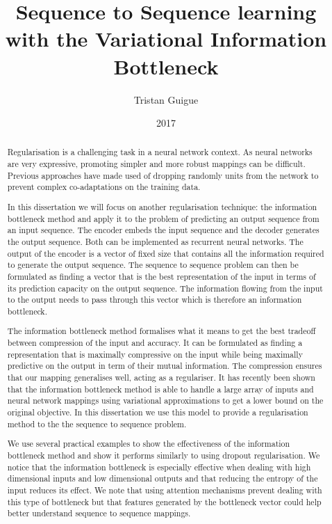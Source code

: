 \documentclass[11pt,oneside,openright]{report}
\title{Sequence to Sequence learning with the Variational Information Bottleneck}
\author{Tristan Guigue}
\date{2017}
\begin{document}
\maketitle

\declaration

\begin{abstract}
Regularisation is a challenging task in a neural network context. As neural networks are very expressive,  promoting simpler and more robust mappings can be difficult. Previous approaches have made used of dropping randomly units from the network to prevent complex co-adaptations on the training data.

In this dissertation we will focus on another regularisation technique: the information bottleneck method and apply it to the problem of predicting an output sequence from an input sequence. The encoder embeds the input sequence and the decoder generates the output sequence. Both can be implemented as recurrent neural networks. The output of the encoder is a vector of fixed size that contains all the information required to generate the output sequence. The sequence to sequence problem can then be formulated as finding a vector that is the best representation of the input in terms of its prediction capacity on the output sequence. The information flowing from the input to the output needs to pass through this vector which is therefore an information bottleneck.

The information bottleneck method formalises what it means to get the best tradeoff between compression of the input and accuracy. It can be formulated as finding a representation that is maximally compressive on the input while being maximally predictive on the output in term of their mutual information. The compression ensures that our mapping generalises well, acting as a regulariser. It has recently been shown \cite{vib} that the information bottleneck method is able to handle a large array of inputs and neural network mappings using variational approximations to get a lower bound on the original objective. In this dissertation we use this model to provide a regularisation method to the the sequence to sequence problem.

We use several practical examples to show the effectiveness of the information bottleneck method and show it performs similarly to using dropout regularisation. We notice that the information bottleneck is especially effective when dealing with high dimensional inputs and low dimensional outputs and that reducing the entropy of the input reduces its effect. We note that using attention mechanisms prevent dealing with this type of bottleneck but that features generated by the bottleneck vector could help better understand sequence to sequence mappings.  


\end{abstract}
\end{document}
